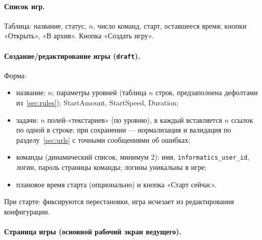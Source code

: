 \documentclass[12pt,a4paper]{article}
\newcommand{\field}[1]{\texttt{#1}}
\newcommand{\btn}[1]{«#1»}
\begin{document}
\paragraph{Список игр.} Таблица: название, статус, $n$, число команд,
старт, оставшееся время; кнопки \btn{Открыть}, \btn{В архив}. Кнопка
\btn{Создать игру}.

\paragraph{Создание/редактирование игры (\field{draft}).} Форма:

\begin{itemize}[nosep]
  \item название; $n$; параметры уровней (таблица $n$ строк, предзаполнена
        дефолтами из~\ref{sec:rules}); StartAmount, StartSpeed, Duration;
  \item задачи: $n$ полей-«текстариев» (по уровню), в каждый вставляется
        $n$ ссылок по одной в строке; при сохранении --- нормализация и
        валидация по разделу~\ref{sec:urls} с точными сообщениями об
        ошибках;
  \item команды (динамический список, минимум 2): имя,
        \field{informatics\_user\_id}, логин, пароль страницы команды;
        логины уникальны в игре;
  \item плановое время старта (опционально) и кнопка \btn{Старт сейчас}.
\end{itemize}

При старте: фиксируются перестановки, игра исчезает из редактирования
конфигурации.

\paragraph{Страница игры (основной рабочий экран ведущего).}
\end{document}
